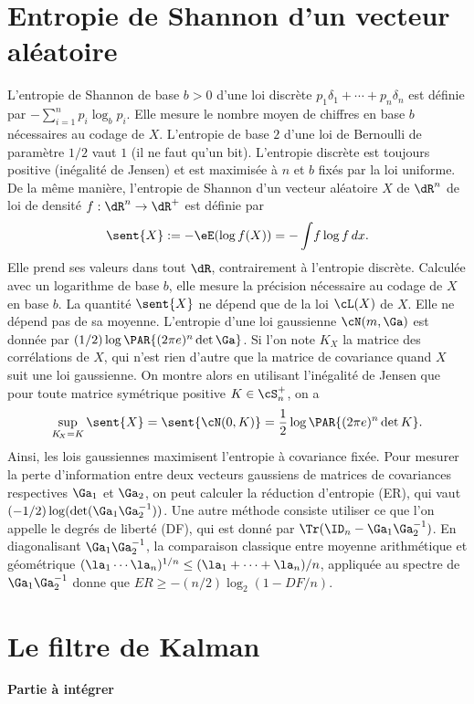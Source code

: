 \section{Entropie de Shannon d'un vecteur aléatoire}
%
L'entropie de Shannon de base $b>0$ d'une loi discrète $p_1\delta_1+\cdots+
p_n\delta_n$ est définie par $-\sum_{i=1}^n p_i\log_b p_i$.  Elle mesure le
nombre moyen de chiffres en base $b$ nécessaires au codage de $X$. L'entropie
de base $2$ d'une loi de Bernoulli de paramètre $1/2$ vaut $1$ (il ne faut
qu'un bit). L'entropie discrète est toujours positive (inégalité de Jensen) et
est maximisée à $n$ et $b$ fixés par la loi uniforme.  De la même manière,
l'entropie de Shannon d'un vecteur aléatoire $X$ de $\dR^n$ de loi de densité
$f:\dR^n\to\dR^+$ est définie par
$$
\sent{X}:=-\eE(\log f(X))=-\int\!f\log f\,dx.
$$
Elle prend ses valeurs dans tout $\dR$, contrairement à l'entropie
discrète.  Calculée avec un logarithme de base $b$, elle mesure la précision
nécessaire au codage de $X$ en base $b$. La quantité $\sent{X}$ ne dépend que
de la loi $\cL(X)$ de $X$. Elle ne dépend pas de sa moyenne. L'entropie d'une
loi gaussienne $\cN(m,\Ga)$ est donnée par $(1/2) \log \PAR{(2\pi e)^n\det
  \Ga}$.  Si l'on note $K_{\!X}$ la matrice des corrélations de $X$, qui n'est
rien d'autre que la matrice de covariance quand $X$ suit une loi gaussienne.
On montre alors en utilisant l'inégalité de Jensen que pour toute matrice
symétrique positive $K\in\cS_n^+$, on a
$$
\sup_{K_{\!X}=K}\sent{X} = \sent{\cN(0,K)} = \frac{1}{2} \log \PAR{(2\pi
  e)^n\det K}.
$$
Ainsi, les lois gaussiennes maximisent l'entropie à covariance fixée. Pour
mesurer la perte d'information entre deux vecteurs gaussiens de matrices de
covariances respectives $\Ga_1$ et $\Ga_2$, on peut calculer la réduction
d'entropie (ER), qui vaut $(-1/2)\log(\det(\Ga_1\Ga_2^{-1}))$. Une autre
méthode consiste utiliser ce que l'on appelle le degrés de liberté (DF), qui
est donné par $\Tr(\ID_n-\Ga_1\Ga_2^{-1})$. En diagonalisant
$\Ga_1\Ga_2^{-1}$, la comparaison classique entre moyenne arithmétique et
géométrique $(\la_1\cdots\la_n)^{1/n} \leq (\la_1+\cdots+\la_n)/n$, appliquée au spectre de
$\Ga_1\Ga_2^{-1}$ donne que $ER\geq -(n/2)\log_2(1-DF/n)$. 

%
\section{Le filtre de Kalman}
%


\textbf{Partie à intégrer}


